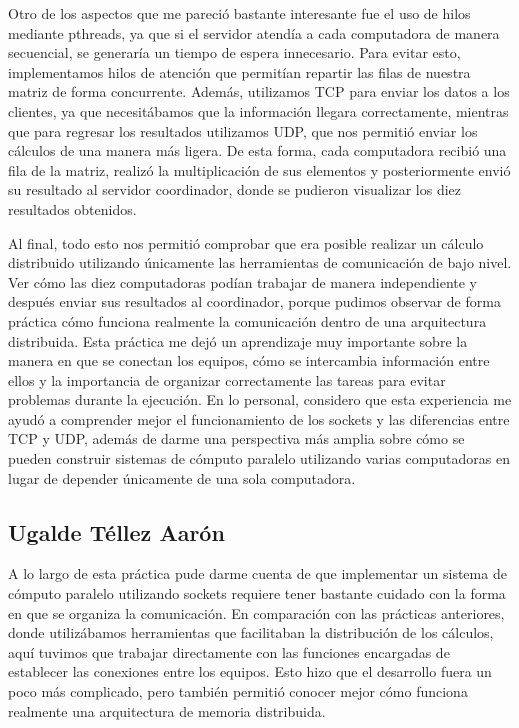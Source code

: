 Otro de los aspectos que me pareció bastante interesante fue el uso de hilos mediante pthreads, ya que si el servidor atendía a cada computadora de manera secuencial, se generaría un tiempo de espera innecesario. Para evitar esto, implementamos hilos de atención que permitían repartir las filas de nuestra matriz de forma concurrente. Además, utilizamos TCP para enviar los datos a los clientes, ya que necesitábamos que la información llegara correctamente, mientras que para regresar los resultados utilizamos UDP, que nos permitió enviar los cálculos de una manera más ligera. De esta forma, cada computadora recibió una fila de la matriz, realizó la multiplicación de sus elementos y posteriormente envió su resultado al servidor coordinador, donde se pudieron visualizar los diez resultados obtenidos.

Al final, todo esto nos permitió comprobar que era posible realizar un cálculo distribuido utilizando únicamente las herramientas de comunicación de bajo nivel. Ver cómo las diez computadoras podían trabajar de manera independiente y después enviar sus resultados al coordinador, porque pudimos observar de forma práctica cómo funciona realmente la comunicación dentro de una arquitectura distribuida. Esta práctica me dejó un aprendizaje muy importante sobre la manera en que se conectan los equipos, cómo se intercambia información entre ellos y la importancia de organizar correctamente las tareas para evitar problemas durante la ejecución. En lo personal, considero que esta experiencia me ayudó a comprender mejor el funcionamiento de los sockets y las diferencias entre TCP y UDP, además de darme una perspectiva más amplia sobre cómo se pueden construir sistemas de cómputo paralelo utilizando varias computadoras en lugar de depender únicamente de una sola computadora.

\clearpage

\subsection{Ugalde Téllez Aarón}
A lo largo de esta práctica pude darme cuenta de que implementar un sistema de cómputo paralelo utilizando sockets requiere tener bastante cuidado con la forma en que se organiza la comunicación. En comparación con las prácticas anteriores, donde utilizábamos herramientas que facilitaban la distribución de los cálculos, aquí tuvimos que trabajar directamente con las funciones encargadas de establecer las conexiones entre los equipos. Esto hizo que el desarrollo fuera un poco más complicado, pero también permitió conocer mejor cómo funciona realmente una arquitectura de memoria distribuida.


